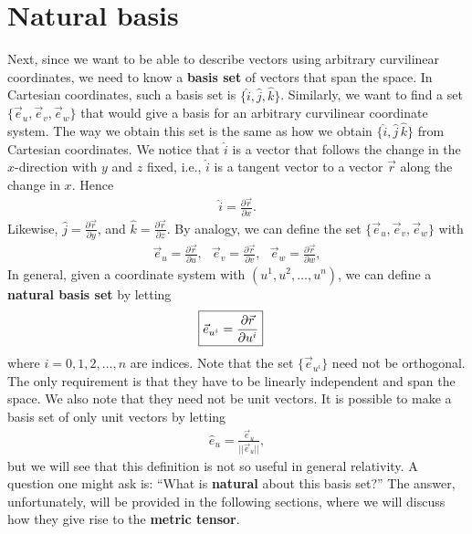 \documentclass{book}
\theoremstyle{definition}
\begin{document}
\section{Natural basis}
Next, since we want to be able to describe vectors using arbitrary curvilinear coordinates, we need to know a \textbf{basis set} of vectors that span the space. In Cartesian coordinates, such a basis set is $\{\hat{i},\hat{j},\hat{k}\}$. Similarly, we want to find a set $\{\vec{e}_u, \vec{e}_v, \vec{e}_w\}$ that would give a basis for an arbitrary curvilinear coordinate system. The way we obtain this set is the same as how we obtain $\{\hat{i}, \hat{j}\, \hat{k}\}$ from Cartesian coordinates. We notice that $\hat{i}$ is a vector that follows the change in the $x$-direction with $y$ and $z$ fixed, i.e., $\hat{i}$ is a tangent vector to a vector $\vec{r}$ along the change in $x$. Hence
\begin{align*}
\hat{i} = \frac{\partial \vec{r}}{\partial x}.
\end{align*}
Likewise, $\hat{j} = \frac{\partial \vec{r}}{\partial y}$, and $\hat{k} = \frac{\partial \vec{r}}{\partial z}$. By analogy, we can define the set $\{ \vec{e}_u, \vec{e}_v, \vec{e}_w\}$ with
\begin{align*}
\vec{e}_u = \frac{\partial \vec{r}}{\partial u}, \text{ } \vec{e}_v = \frac{\partial \vec{r}}{\partial v}, \text{ } \vec{e}_w = \frac{\partial \vec{r}}{\partial w},
\end{align*}
In general, given a coordinate system with $(u^1,u^2,\dots,u^n)$, we can define a \textbf{natural basis set} by letting
\begin{align*}
\Aboxed{\vec{e}_{u^i} = \frac{\partial \vec{r}}{\partial u^i}}
\end{align*}
where $i = 0,1,2,\dots,n$ are indices. Note that the set $\{\vec{e}_{u^i} \}$ need not be orthogonal. The only requirement is that they have to be linearly independent and span the space. We also note that they need not be unit vectors. It is possible to make a basis set of only unit vectors by letting
\begin{align*}
\hat{e}_u = \frac{\vec{e}_u}{\vert\vert \vec{e}_u\vert\vert},
\end{align*}
but we will see that this definition is not so useful in general relativity. A question one might ask is: ``What is \textbf{natural} about this basis set?'' The answer, unfortunately, will be provided in the following sections, where we will discuss how they give rise to the \textbf{metric tensor}.\\
\end{document}
